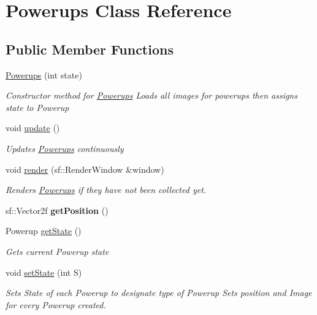 \hypertarget{class_powerups}{}\section{Powerups Class Reference}
\label{class_powerups}
\subsection*{Public Member Functions}
\begin{DoxyCompactItemize}
\item 
\mbox{\hyperlink{class_powerups_acfac7ce2910181c27fe04bf746d86ea5}{Powerups}} (int state)
\begin{DoxyCompactList}\small\item\em Constructor method for \mbox{\hyperlink{class_powerups}{Powerups}} Loads all images for powerups then assigns state to Powerup \end{DoxyCompactList}\item 
void \mbox{\hyperlink{class_powerups_a6cba2ed2ca0432f4d3cf3a7c30b11c4f}{update}} ()
\begin{DoxyCompactList}\small\item\em Updates \mbox{\hyperlink{class_powerups}{Powerups}} continuously \end{DoxyCompactList}\item 
void \mbox{\hyperlink{class_powerups_a2ec98b6e80e478d6690f34db632c691c}{render}} (sf\+::\+Render\+Window \&window)
\begin{DoxyCompactList}\small\item\em Renders \mbox{\hyperlink{class_powerups}{Powerups}} if they have not been collected yet. \end{DoxyCompactList}\item 
\mbox{\label{class_powerups_a2d32a4123814dfbf86de90e1b9be18fd}} 
sf\+::\+Vector2f {\bfseries get\+Position} ()
\item 
Powerup \mbox{\hyperlink{class_powerups_a71da1d29130fcbd9957815044eba11a7}{get\+State}} ()
\begin{DoxyCompactList}\small\item\em Gets current Powerup state \end{DoxyCompactList}\item 
void \mbox{\hyperlink{class_powerups_aac5a818659975d3e6db3f19eceaf6beb}{set\+State}} (int S)
\begin{DoxyCompactList}\small\item\em Sets State of each Powerup to designate type of Powerup Sets position and Image for every Powerup created. \end{DoxyCompactList}\end{DoxyCompactItemize}
